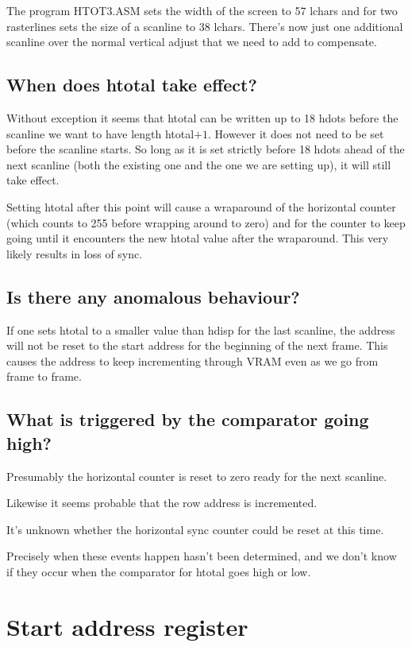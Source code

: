 \documentclass[a4paper,10pt]{amsart}
\begin{document}
The program HTOT3.ASM sets the width of the screen to 57 lchars and for two
rasterlines sets the size of a scanline to 38 lchars. There's now just one
additional scanline over the normal vertical adjust that we need to add to
compensate.

\subsection{When does htotal take effect?}

Without exception it seems that htotal can be written up to 18 hdots before the
scanline we want to have length htotal$+1$. However it does not need to be set
before the scanline starts. So long as it is set strictly before 18 hdots ahead
of the next scanline (both the existing one and the one we are setting up), it
will still take effect.

Setting htotal after this point will cause a wraparound of the horizontal
counter (which counts to 255 before wrapping around to zero) and for the
counter to keep going until it encounters the new htotal value after the
wraparound. This very likely results in loss of sync.

\subsection{Is there any anomalous behaviour?}

If one sets htotal to a smaller value than hdisp for the last scanline, the
address will not be reset to the start address for the beginning of the next
frame. This causes the address to keep incrementing through VRAM even
as we go from frame to frame.

\subsection{What is triggered by the comparator going high?}

Presumably the horizontal counter is reset to zero ready for the next scanline.

Likewise it seems probable that the row address is incremented.

It's unknown whether the horizontal sync counter could be reset at this time.

Precisely when these events happen hasn't been determined, and we don't know
if they occur when the comparator for htotal goes high or low.

\section{Start address register}
\end{document}
